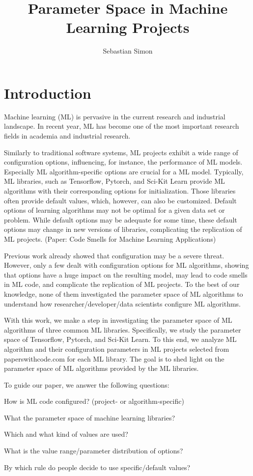 \documentclass[sigconf,review,anonymous]{acmart}
\title{Parameter Space in Machine Learning Projects}
\author{Sebastian Simon}
\affiliation{%
    \institution{Leipzig University}
    \country{Germany}
}
\begin{document}
\maketitle

\section{Introduction}\label{sec:intro}
Machine learning (ML) is pervasive in the current research and industrial landscape. 
In recent year, ML has become one of the most important research fields in academia and industrial research.

Similarly to traditional software systems, ML projects exhibit a wide range of configuration options, influencing, for instance, the performance of ML models. 
Especially ML algorithm-specific options are crucial for a ML model. 
Typically, ML libraries, such as Tensorflow, Pytorch, and Sci-Kit Learn provide ML algorithms with their corresponding options for initialization. 
Those libraries often provide default values, which, however, can also be customized. 
Default options of learning algorithms may not be optimal for a given data set or problem. 
While default options may be adequate for some time, these default options may change in new versions of libraries, complicating the replication of ML projects. (Paper: Code Smells for Machine Learning Applications)

Previous work already showed that configuration may be a severe threat. 
However, only a few dealt with configuration options for ML algorithms, showing that options have a huge impact on the resulting model, may lead to code smells in ML code, and complicate the replication of ML projects. 
To the best of our knowledge, none of them investigated the parameter space of ML algorithms to understand how researcher/developer/data scientists configure ML algorithms.

With this work, we make a step in investigating the parameter space of ML algorithms of three common ML libraries. 
Specifically, we study the parameter space of Tensorflow, Pytorch, and Sci-Kit Learn.
To this end, we analyze ML algorithm and their configuration parameters in ML projects selected from paperswithcode.com for each ML library.
The goal is to shed light on the parameter space of ML algorithms provided by the ML libraries.

To guide our paper, we answer the following questions:
\begin{questions}
    \item How is ML code configured? (project- or algorithm-specific) 
    \item What the parameter space of machine learning libraries?
    \item Which and what kind of values are used?
    \item What is the value range/parameter distribution of options?
    \item By which rule do people decide to use specific/default values?
\end{questions}
\end{document}
